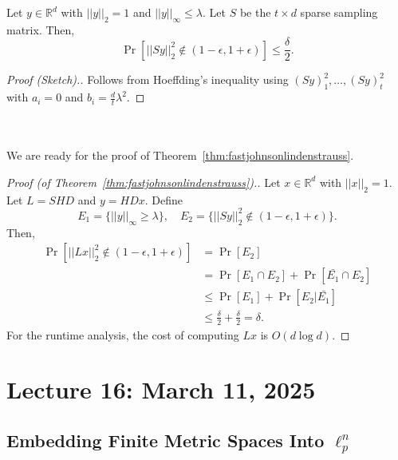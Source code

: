         \begin{lemma*}
            Let \(y\in\mathbb{R}^d\) with \(||y||_2=1\) and \(||y||_\infty\leq\lambda\). Let \(S\) be the \(t\times d\) sparse sampling matrix. Then,
            \begin{equation*}
                \Pr[||Sy||_2^2\nin(1-\epsilon,1+\epsilon)]\leq\frac{\delta}{2}.
            \end{equation*}
            \begin{proof}[Proof (Sketch).]
                Follows from Hoeffding's inequality using \((Sy)_1^2,\ldots,(Sy)_t^2\) with \(a_i=0\) and \(b_i=\frac{d}{t}\lambda^2\).
            \end{proof}
        \end{lemma*}
        \vphantom
        \\
        \\
        We are ready for the proof of Theorem~\ref{thm:fastjohnsonlindenstrauss}.
        \begin{proof}[Proof (of Theorem~\ref{thm:fastjohnsonlindenstrauss}).]
            Let \(x\in\mathbb{R}^d\) with \(||x||_2=1\). Let \(L=SHD\) and \(y=HDx\). Define
            \begin{equation*}
                E_1=\{||y||_\infty\geq\lambda\},\quad E_2=\{||Sy||_2^2\nin(1-\epsilon,1+\epsilon)\}.
            \end{equation*}
            Then,
            \begin{align*}
                \Pr[||Lx||_2^2\nin(1-\epsilon,1+\epsilon)]&=\Pr[E_2] \\
                &=\Pr[E_1\cap E_2]+\Pr[\bar{E_1}\cap E_2] \\
                &\leq \Pr[E_1]+\Pr[E_2|\bar{E_1}] \\
                &\leq\frac{\delta}{2}+\frac{\delta}{2}=\delta.
            \end{align*}
            For the runtime analysis, the cost of computing \(Lx\) is \(O(d\log d)\).
        \end{proof}

\pagebreak

\section{Lecture 16: March 11, 2025}

    \subsection{Embedding Finite Metric Spaces Into \(\ell_p^n\)}

